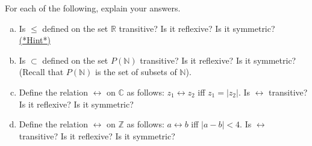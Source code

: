 \begin{exercise}\label{exercise:EquivalenceRelationsChap:17}
For each of the following, explain your answers. 
\begin{enumerate}[(a)]
\item Is $\leq$ defined on the set $\mathbb{R}$ transitive? Is it reflexive? Is it symmetric?
\hyperref[sec:EquivalenceRelationsChap:hints]{(*Hint*)}
\item Is $\subset$ defined on the set $P(\mathbb{N})$ transitive? Is it reflexive? Is it symmetric? (Recall that $P(\mathbb{N})$ is the set of subsets of $\mathbb{N}$).
\item Define the relation $\rel$ on $\mathbb{C}$ as follows: $ z_1 \rel z_2$ iff $z_1 = |z_2|$. Is $\rel$ transitive? Is it reflexive? Is it symmetric?
\item Define the relation $\rel$ on $\mathbb{Z}$ as follows: $ a \rel b$ iff $|a - b|< 4$. Is $\rel$ transitive? Is it reflexive? Is it symmetric?
\end{enumerate}
\end{exercise}



